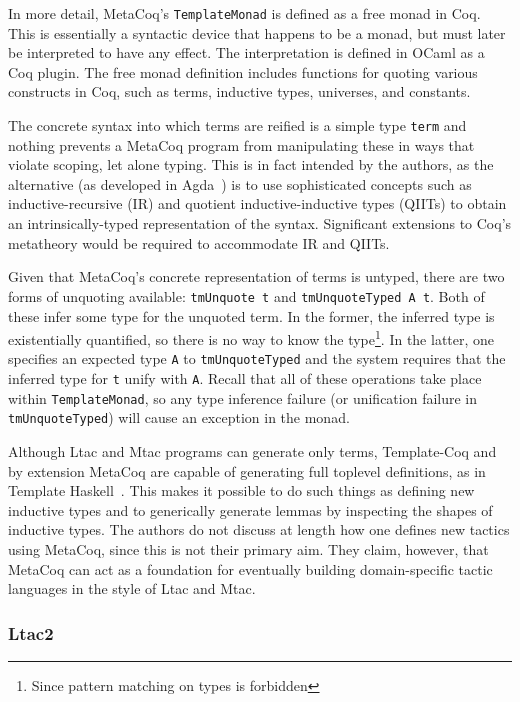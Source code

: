 \newcommand{\tmonad}{\texttt{TemplateMonad}}
In more detail, MetaCoq's \tmonad{} is defined as a free monad in Coq.
This is essentially a syntactic device that happens to be a monad, but must
later be interpreted to have any effect.
The interpretation is defined in OCaml as a Coq plugin.
The free monad definition includes functions for quoting various constructs in
Coq, such as terms, inductive types, universes, and constants.

The concrete syntax into which terms are reified is a simple type \texttt{term}
and nothing prevents a MetaCoq program from manipulating these in ways that
violate scoping, let alone typing.
This is in fact intended by the authors, as the alternative (as developed in
Agda~\cite{agda-reflection}) is to use sophisticated
concepts such as inductive-recursive (IR) and quotient inductive-inductive types
(QIITs) to obtain an intrinsically-typed representation of the syntax.
Significant extensions to Coq's metatheory would be required to accommodate IR
and QIITs.

Given that MetaCoq's concrete representation of terms is untyped, there are two
forms of unquoting available: \texttt{tmUnquote t} and \texttt{tmUnquoteTyped A t}.
Both of these infer some type for the unquoted term. In the former, the inferred
type is existentially quantified, so there is no way to know the
type\footnote{Since pattern matching on types is forbidden}.
In the latter, one specifies an expected type \texttt{A} to
\texttt{tmUnquoteTyped} and the system requires that the inferred type for
\texttt{t} unify with \texttt{A}.
Recall that all of these operations take place within \tmonad, so any type
inference failure (or unification failure in \texttt{tmUnquoteTyped}) will cause
an exception in the monad.

Although Ltac and Mtac programs can generate only terms, Template-Coq and by
extension MetaCoq are capable of generating full toplevel definitions, as in
Template Haskell~\cite{template-haskell}.
This makes it possible to do such things as defining new inductive types and
to generically generate lemmas by inspecting the shapes of inductive types.
The authors do not discuss at length how one defines new tactics using MetaCoq,
since this is not their primary aim. They claim, however, that MetaCoq can act
as a foundation for eventually building domain-specific tactic languages in the
style of Ltac and Mtac.

\subsubsection{Ltac2}

